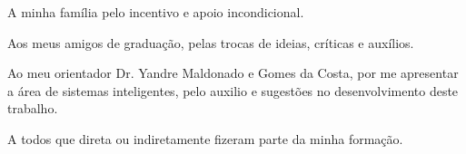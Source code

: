 
\begin{agradecimentos}[AGRADECIMENTOS]

A minha família pelo incentivo e apoio incondicional.
\par Aos meus amigos de graduação, pelas trocas de ideias, críticas e auxílios.
\par Ao meu orientador Dr. Yandre Maldonado e Gomes da Costa, por me apresentar a área de sistemas inteligentes, pelo auxilio e sugestões no desenvolvimento deste trabalho.
\par A todos que direta ou indiretamente fizeram parte da minha formação. 
\end{agradecimentos}
